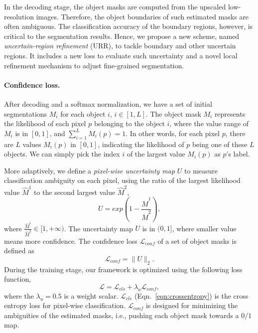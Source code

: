 \documentclass{article}
\begin{document}
In the decoding stage, the object masks are computed from the upscaled low-resolution images. Therefore, the object boundaries of such estimated masks are often ambiguous. 
The classification accuracy of the boundary regions, however, is critical to the segmentation results.
Hence, we propose a new scheme, named \emph{uncertain-region refinement} (URR), to tackle boundary and other uncertain regions. 
It includes a new loss to evaluate such uncertainty and a novel local refinement mechanism to adjust fine-grained segmentation.  

\paragraph{Confidence loss.}
After decoding and a softmax normalization, we have a set of initial segmentations $M_i$ for each object $i$, $i \in [1, L]$.
The object mask $M_i$ represents the likelihood of each pixel $p$ belonging to the object $i$, where the value range of $M_i$ is in $[0, 1]$, and $\sum_{i=1}^L M_i(p) =1$. 
In other words, for each pixel $p$, there are $L$ values $M_i(p)$ in $[0, 1]$, indicating the likelihood of $p$ being one of these $L$ objects.
We can simply pick the index $i$ of the largest value $M_i(p)$ as $p$'s label. 

More adaptively, we define a \emph{pixel-wise uncertainty map} $U$ to measure classification ambiguity on each pixel, using the ratio of the largest likelihood value $\hat{M}^1$ to the second largest value $\hat{M}^2$,
\begin{equation}
  U = exp(1- \frac{\hat{M}^1}{\hat{M}^2}),
\end{equation}
where $\frac{\hat{M}^1}{\hat{M}^2} \in [1, +\infty)$.
The uncertainty map $U$ is in $(0, 1]$, where smaller value means more confidence. 
The confidence loss $\mathcal{L}_{conf}$ of a set of object masks is defined as
\begin{equation}
    \mathcal{L}_{conf} = \lVert U \rVert_2.
\end{equation}
During the training stage, our framework is optimized using the following loss function,
\begin{equation}
    \mathcal{L} =  \mathcal{L}_{cls} + \lambda_u\mathcal{L}_{conf},
    \label{eqn:loss}
\end{equation}
where the $\lambda_u = 0.5$ is a weight scalar.
$\mathcal{L}_{cls}$ (Eqn.~\ref{eqn:crossentropy}) is the cross entropy loss for pixel-wise classification. 
$\mathcal{L}_{conf}$ is designed for minimizing the ambiguities of the estimated masks, i.e., pushing each object mask towards a $0/1$ map.
\end{document}
